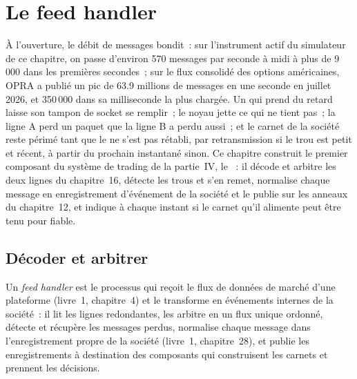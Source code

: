 \chapter{Le feed handler}\label{ch:ll:the-feed-handler}

À l'ouverture, le débit de messages bondit~: sur l'instrument actif du simulateur de ce chapitre, on passe d'environ 570 messages par seconde à
midi à plus de 9\,000 dans les premières secondes~; sur le flux consolidé des options américaines, OPRA a publié un pic de 63.9
millions de messages en une seconde en juillet 2026, et 350\,000 dans sa milliseconde la plus chargée. Un  qui prend du retard laisse son
tampon de socket se remplir~; le noyau jette ce qui ne tient pas~; la ligne A perd un paquet que la ligne B a perdu aussi~; et le carnet de la société
reste périmé tant que le  ne s'est pas rétabli, par retransmission si le trou est petit et récent, à partir du prochain instantané sinon.
Ce chapitre construit le premier composant du système de trading de la partie~IV, le ~: il décode et arbitre les deux
lignes du chapitre~16, détecte les trous et s'en remet, normalise chaque message en enregistrement d'événement de la société et le publie
sur les anneaux du chapitre~12, et indique à chaque instant si le carnet qu'il alimente peut être tenu pour fiable.

\section{Décoder et arbitrer}

\begin{definition}\label{def:ll:the-feed-handler:handler}
Un \emph{feed handler} est le processus qui reçoit le flux de données de marché d'une plateforme (livre~1,
chapitre~4) et le transforme en événements internes de la société~: il lit les lignes redondantes, les arbitre en un flux unique
ordonné, détecte et récupère les messages perdus, normalise chaque message dans l'enregistrement propre de la société (livre~1, chapitre~28), et
publie les enregistrements à destination des composants qui construisent les carnets et prennent les décisions.
\end{definition}

